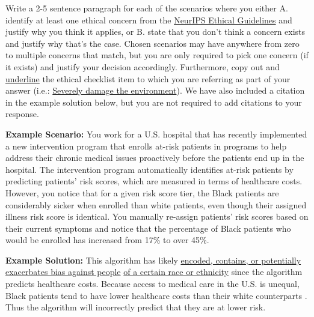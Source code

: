 Write a 2-5 sentence paragraph for each of the scenarios where you either A. identify at least one ethical concern from the \href{https://nips.cc/Conferences/2023/EthicsGuidelinesForReviewers}{NeurIPS Ethical Guidelines} and justify why you think it applies, or B. state that you don't think a concern exists and justify why that's the case. Chosen scenarios may have anywhere from zero to multiple concerns that match, but you are only required to pick one concern (if it exists) and justify your decision accordingly. Furthermore, copy out and \underline{underline} the ethical checklist item to which you are referring as part of your answer (i.e.: \underline{Severely damage the environment}). We have also included a citation in the example solution below, but you are not required to add citations to your response.

\textbf{Example Scenario: }You work for a U.S. hospital that has recently implemented a new intervention program that enrolls at-risk patients in programs to help address their chronic medical issues proactively before the patients end up in the hospital. The intervention program automatically identifies at-risk patients by predicting patients' risk scores, which are measured in terms of healthcare costs. However, you notice that for a given risk score tier, the Black patients are considerably sicker when enrolled than white patients, even though their assigned illness risk score is identical. You manually re-assign patients' risk scores based on their current symptoms and notice that the percentage of Black patients who would be enrolled has increased from 17\% to over 45\%. \cite{obermeyer2019dissecting}

\textbf{Example Solution: }This algorithm has likely \underline{encoded, contains, or potentially exacerbates bias against people} 
\underline{of a certain race or ethnicity} since the algorithm predicts healthcare costs. Because access to medical care in the U.S. is unequal, Black patients tend to have lower healthcare costs than their white counterparts \cite{iom2003unequal}. Thus the algorithm will incorrectly predict that they are at lower risk.

\begin{enumerate}

  

  

  

  

\end{enumerate}